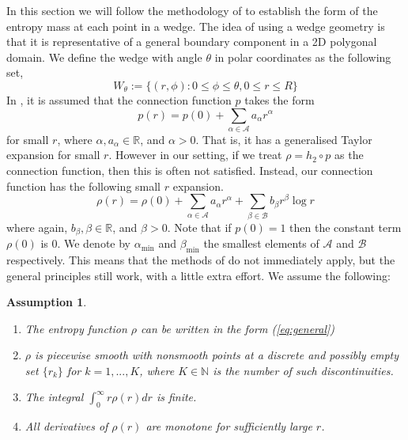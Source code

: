 \documentclass{article}
\newtheorem{assumption}{Assumption}
\begin{document}
        In this section we will follow the methodology of \cite{dettmann2016random} to establish the form of the entropy mass at each point in a wedge. The idea of using a wedge geometry is that it is representative of a general boundary component in a 2D polygonal domain. We define the wedge with angle $\theta$ in polar coordinates as the following set,
        \begin{equation}
            W_{\theta} := \{(r,\phi): 0 \leq \phi \leq \theta, 0 \leq r \leq R\}
        \end{equation}
        In \cite{dettmann2016random}, it is assumed that the connection function $p$ takes the form
        \begin{equation}
            p(r) = p(0) + \sum_{\alpha \in \mathcal{A}} a_{\alpha}r^{\alpha}
        \end{equation}
        for small $r$, where $\alpha, a_{\alpha} \in \mathbb{R}$, and $\alpha > 0$. That is, it has a generalised Taylor expansion for small $r$. However in our setting, if we treat $\rho = h_2 \circ p$ as the connection function, then this is often not satisfied. Instead, our connection function has the following small $r$ expansion.
        \begin{equation}
            \label{eq:general}
            \rho(r) = \rho(0) + \sum_{\alpha \in \mathcal{A}}a_{\alpha}r^{\alpha} + \sum_{\beta \in \mathcal{B}} b_{\beta} r^{\beta}\log r
        \end{equation}
        where again, $b_\beta, \beta \in \mathbb{R}$, and $\beta > 0$. Note that if $p(0) = 1$ then the constant term $\rho(0)$ is 0. We denote by $\alpha_\min$ and $\beta_\min$ the smallest elements of $\mathcal{A}$ and $\mathcal{B}$ respectively. This means that the methods of \cite{dettmann2016random} do not immediately apply, but the general principles still work, with a little extra effort. We assume the following:
        \begin{assumption}
            \begin{enumerate}
                \item The entropy function $\rho$ can be written in the form (\ref{eq:general})
                \item $\rho$ is piecewise smooth with nonsmooth points at a discrete and possibly empty set $\{r_k\}$ for $k = 1,...,K$, where $K \in \mathbb{N}$ is the number of such discontinuities.
                \item The integral $\int_0^\infty r\rho(r)dr$ is finite.
                \item All derivatives of $\rho(r)$ are monotone for sufficiently large $r$.
            \end{enumerate}
        \end{assumption}
\end{document}
